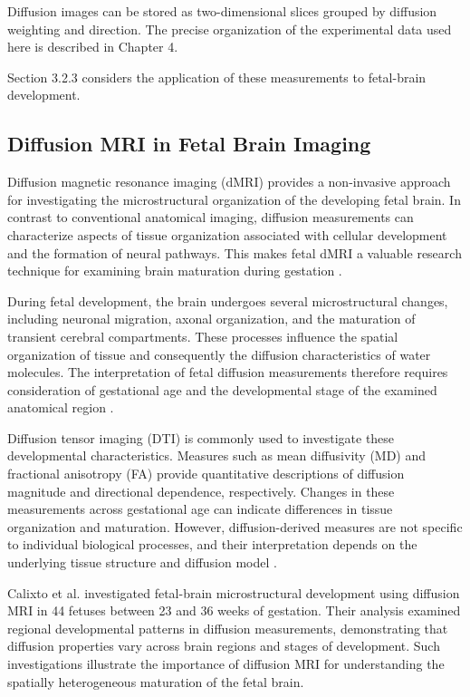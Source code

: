 Diffusion images can be stored as two-dimensional slices grouped by diffusion weighting and direction. The precise organization of the experimental data used here is described in Chapter 4.

Section 3.2.3 considers the application of these measurements to fetal-brain development.

\subsection{Diffusion MRI in Fetal Brain Imaging}

Diffusion magnetic resonance imaging (dMRI) provides a non-invasive approach for investigating the microstructural organization of the developing fetal brain. In contrast to conventional anatomical imaging, diffusion measurements can characterize aspects of tissue organization associated with cellular development and the formation of neural pathways. This makes fetal dMRI a valuable research technique for examining brain maturation during gestation \autocite{christiaens2019inutero}.

During fetal development, the brain undergoes several microstructural changes, including neuronal migration, axonal organization, and the maturation of transient cerebral compartments. These processes influence the spatial organization of tissue and consequently the diffusion characteristics of water molecules. The interpretation of fetal diffusion measurements therefore requires consideration of gestational age and the developmental stage of the examined anatomical region \autocite{christiaens2019inutero,calixto2024microstructure}.

Diffusion tensor imaging (DTI) is commonly used to investigate these developmental characteristics. Measures such as mean diffusivity (MD) and fractional anisotropy (FA) provide quantitative descriptions of diffusion magnitude and directional dependence, respectively. Changes in these measurements across gestational age can indicate differences in tissue organization and maturation. However, diffusion-derived measures are not specific to individual biological processes, and their interpretation depends on the underlying tissue structure and diffusion model \autocite{calixto2024microstructure}.

Calixto et al. \autocite{calixto2024microstructure} investigated fetal-brain microstructural development using diffusion MRI in 44 fetuses between 23 and 36 weeks of gestation. Their analysis examined regional developmental patterns in diffusion measurements, demonstrating that diffusion properties vary across brain regions and stages of development. Such investigations illustrate the importance of diffusion MRI for understanding the spatially heterogeneous maturation of the fetal brain.

